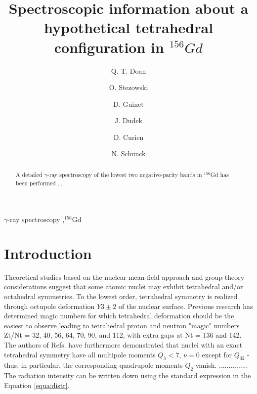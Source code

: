 \documentclass[3p,12pt]{elsarticle}%
\begin{document}
\begin{frontmatter}

\title{Spectroscopic information about a hypothetical tetrahedral configuration in $^{156}Gd$}

\author[ipnl]{Q. T. Doan}
\author[ipnl,ucbl]{O. Stezowski}
\author[ipnl,ucbl]{D. Guinet}
\author[iphc]{J. Dudek}
\author[iphc]{D. Curien}
\author[pan]{N. Schunck}

\address[ipnl]{Institut de Physique Nucl\'eaire de Lyon, France}
\address[ucbl]{Universit\'e de Lyon, Universit\'e Lyon 1, Lyon, France}
\address[iphc]{Departement de Recherches Subatomiques, Institut Pluridisciplinaire Hubert Curien, Strasbourg, France}
\address[pan]{Institute of Nuclear Physics PAN, PL-31-342 Krak\'ow, Poland}

 

\begin{abstract}
A detailed $\gamma$-ray spectroscopy of the lowest two negative-parity bands in $^{156}$Gd has been performed ...
\end{abstract}

\begin{keyword}
$\gamma$-ray spectroscopy \sep $^{156}$Gd
\end{keyword}

\end{frontmatter}



\section{Introduction}
\label{sec:intro}

Theoretical studies based on the nuclear mean-field approach and group theory considerations suggest \cite{bib_dudek2006, bib_schunk2006} that some atomic nuclei may exhibit tetrahedral and/or octahedral symmetries. To the lowest order, tetrahedral symmetry is realized through octupole deformation $Y3\pm 2$ of the nuclear surface. Previous research\cite{bib_dudek2002} has determined magic numbers for which tetrahedral deformation should be the easiest to observe leading to tetrahedral proton and neutron "magic" numbers Zt/Nt = 32, 40, 56, 64, 70, 90, and 112, with extra gaps at Nt = 136 and 142. The authors of Refs. \cite{bib_dudek2006, bib_schunk2006, bib_dudek2002} have furthermore demonstrated that nuclei with an exact tetrahedral symmetry have all multipole moments $Q_\lambda < 7$, $\nu = 0$ except for $Q_{32}$ - thus, in particular, the corresponding quadrupole moments $Q_2$ vanish.
...............
The radiation intensity can be written down using the standard expression in the Equation \ref{equa:distr}.
\end{document}
